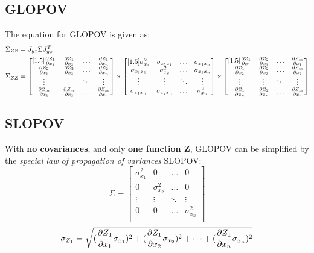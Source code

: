 \subsection{GLOPOV}
The equation for GLOPOV is given as:
\begin{align*}
\Sigma_{ZZ} &= 
J_{yx}\Sigma J_{yx}^T \\
\Sigma_{ZZ} &= 
\begin{bmatrix}[1.5]
\frac{\partial Z_1}{\partial x_1} & \frac{\partial Z_1}{\partial x_2} & \hdots & \frac{\partial Z_1}{\partial x_n} \\
\frac{\partial Z_2}{\partial x_1} & \frac{\partial Z_2}{\partial x_2} & \hdots & \frac{\partial Z_2}{\partial x_n} \\
\vdots & \vdots & \ddots & \vdots \\
\frac{\partial Z_m}{\partial x_1} & \frac{\partial Z_m}{\partial x_2} & \hdots & \frac{\partial Z_m}{\partial x_n} \\
\end{bmatrix}
\times
\begin{bmatrix}[1.5]
\sigma^2_{x_{1}} & \sigma_{x_{1}x_{2}} & \hdots & \sigma_{x_{1}x_{n}} \\
\sigma_{x_{1}x_{2}} & \sigma^2_{x_{2}} & \hdots & \sigma_{x_{2}x_{n}} \\
\vdots & \vdots & \ddots & \vdots \\
\sigma_{x_{1}x_{n}} & \sigma_{x_{2}x_{n}} & \hdots & \sigma^2_{x_{n}} \\
\end{bmatrix}
\times
\begin{bmatrix}[1.5]
\frac{\partial Z_1}{\partial x_1} & \frac{\partial Z_2}{\partial x_1} & \hdots & \frac{\partial Z_m}{\partial x_1} \\
\frac{\partial Z_1}{\partial x_2} & \frac{\partial Z_2}{\partial x_2} & \hdots & \frac{\partial Z_m}{\partial x_2} \\
\vdots & \vdots & \ddots & \vdots \\
\frac{\partial Z_1}{\partial x_n} & \frac{\partial Z_2}{\partial x_n} & \hdots & \frac{\partial Z_m}{\partial x_n} \\
\end{bmatrix}
\end{align*}

\subsection{SLOPOV}
With \textbf{no covariances}, and only \textbf{one function Z}, GLOPOV can be simplified by the \textit{special law of propagation of variances} SLOPOV:
\[
\Sigma = 
\begin{bmatrix}
\sigma^2_{x_{1}} & 0 & \hdots & 0 \\
0 & \sigma^2_{x_{2}} & \hdots & 0 \\
\vdots & \vdots & \ddots & \vdots \\
0 & 0 & \hdots & \sigma^2_{x_{n}} \\
\end{bmatrix}
\]
\[
\sigma_{Z_1} = \sqrt{(\frac{\partial Z_1}{\partial x_1} \sigma_{x_1})^2+(\frac{\partial Z_1}{\partial x_2} \sigma_{x_2})^2+\dots+(\frac{\partial Z_1}{\partial x_n} \sigma_{x_n})^2}
\]
\clearpage
